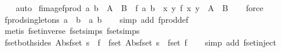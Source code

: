 \begin{isabellebody}
\ \ \isamarkupfalse%
\ auto%
\endisatagproof
{\isafoldproof}%
%
\isadelimproof
\isanewline
%
\endisadelimproof
\isanewline
{}\isamarkupfalse%
\ fimage{\isacharunderscore}fprod{\isacharcolon}\ {\isachardoublequoteopen}{\isacharparenleft}a{\isacharcomma}\ b{\isacharparenright}\ {\isacharbar}{\isasymin}{\isacharbar}\ A\ {\isacharbar}{\isasymtimes}{\isacharbar}\ B\ {\isasymLongrightarrow}\ f\ a\ b\ {\isacharbar}{\isasymin}{\isacharbar}\ {\isacharparenleft}{\isasymlambda}{\isacharparenleft}x{\isacharcomma}\ y{\isacharparenright}{\isachardot}\ f\ x\ y{\isacharparenright}\ {\isacharbar}{\isacharbackquote}{\isacharbar}\ {\isacharparenleft}A\ {\isacharbar}{\isasymtimes}{\isacharbar}\ B{\isacharparenright}{\isachardoublequoteclose}\isanewline
%
\isadelimproof
\ \ %
\endisadelimproof
%
\isatagproof
{}\isamarkupfalse%
\ force%
\endisatagproof
{\isafoldproof}%
%
\isadelimproof
\isanewline
%
\endisadelimproof
\isanewline
{}\isamarkupfalse%
\ fprod{\isacharunderscore}singletons{\isacharcolon}\ {\isachardoublequoteopen}{\isacharbraceleft}{\isacharbar}a{\isacharbar}{\isacharbraceright}\ {\isacharbar}{\isasymtimes}{\isacharbar}\ {\isacharbraceleft}{\isacharbar}b{\isacharbar}{\isacharbraceright}\ {\isacharequal}\ {\isacharbraceleft}{\isacharbar}{\isacharparenleft}a{\isacharcomma}\ b{\isacharparenright}{\isacharbar}{\isacharbraceright}{\isachardoublequoteclose}\isanewline
%
\isadelimproof
\ \ %
\endisadelimproof
%
\isatagproof
{}\isamarkupfalse%
\ {\isacharparenleft}simp\ add{\isacharcolon}\ fprod{\isacharunderscore}def{\isacharparenright}\isanewline
\ \ \isamarkupfalse%
\ {\isacharparenleft}metis\ fset{\isacharunderscore}inverse\ fset{\isacharunderscore}simps{\isacharparenleft}{}{\isacharparenright}\ fset{\isacharunderscore}simps{\isacharparenleft}{}{\isacharparenright}{\isacharparenright}%
\endisatagproof
{\isafoldproof}%
%
\isadelimproof
\isanewline
%
\endisadelimproof
\isanewline
{}\isamarkupfalse%
\ fset{\isacharunderscore}both{\isacharunderscore}sides{\isacharcolon}\ {\isachardoublequoteopen}{\isacharparenleft}Abs{\isacharunderscore}fset\ s\ {\isacharequal}\ f{\isacharparenright}\ {\isacharequal}\ {\isacharparenleft}fset\ {\isacharparenleft}Abs{\isacharunderscore}fset\ s{\isacharparenright}\ {\isacharequal}\ fset\ f{\isacharparenright}{\isachardoublequoteclose}\isanewline
%
\isadelimproof
\ \ %
\endisadelimproof
%
\isatagproof
{}\isamarkupfalse%
\ {\isacharparenleft}simp\ add{\isacharcolon}\ fset{\isacharunderscore}inject{\isacharparenright}%

\end{isabellebody}
